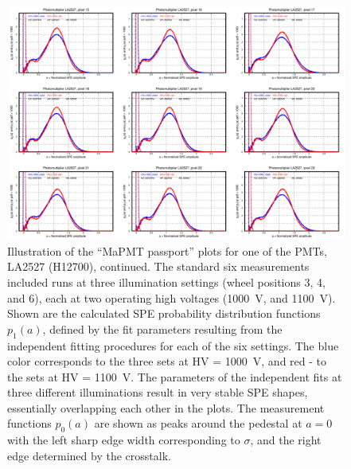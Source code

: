 \begin{figure}[!ht]
	\centering
	\includegraphics[width=1.0\textwidth,height=.7\textwidth]{figures/pavel_temp/LA2527_spectra_temp.png}
	\caption{Illustration of the ``MaPMT passport'' plots for one of the PMTs, LA2527 (H12700), continued. The standard six measurements included runs at three illumination settings (wheel positions 3, 4, and 6), each at two operating high voltages (1000~V, and 1100~V). Shown are the calculated SPE probability distribution functions $p_1(a)$, defined by the fit parameters resulting from the independent fitting procedures for each of the six settings. The blue color corresponds to the three sets at HV = 1000~V, and red - to the sets at HV = 1100~V. The parameters of the independent fits at three different illuminations result in very stable SPE shapes, essentially overlapping each other in the plots. The measurement functions $p_0(a)$ are shown as peaks around the pedestal at $a=0$ with the left sharp edge width corresponding to $\sigma$, and the right edge determined by the crosstalk.}
	\label{fig:LA2527_passport_spectra}
\end{figure}


